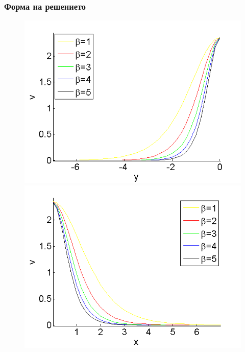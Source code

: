 \documentclass{beamer}
\begin{document}
\begin{frame}
\frametitle{Форма на решението}
\begin{figure}[ht]
	\begin{minipage}[b]{0.45\linewidth}
		\raggedleft
		\includegraphics[width=\linewidth]{../Thesis/SolutionProfiles/ChristovIVX=0_ZB2_bt1_5_c017_h020_O(h^6).png}
	\end{minipage}	
	\begin{minipage}[b]{0.45\linewidth}
		\raggedright
		 \includegraphics[width=\linewidth]{../Thesis/SolutionProfiles/ChristovIVY=0_ZB2_bt1_5_c017_h020_O(h^6).png}
	\end{minipage}
	\begin{minipage}[b]{0.45\linewidth}

\end{minipage}
\end{figure}
\end{frame}
\end{document}
